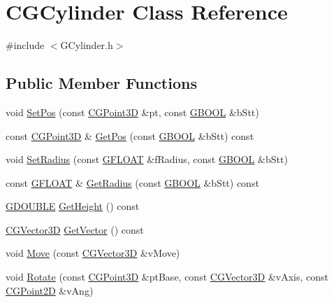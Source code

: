 \hypertarget{class_c_g_cylinder}{}\section{C\+G\+Cylinder Class Reference}
\label{class_c_g_cylinder}


{\ttfamily \#include $<$G\+Cylinder.\+h$>$}

\subsection*{Public Member Functions}
\begin{DoxyCompactItemize}
\item 
void \hyperlink{class_c_g_cylinder_ad4635b5bfc115548b15a307ff91fb421}{Set\+Pos} (const \hyperlink{class_c_g_point3_d}{C\+G\+Point3\+D} \&pt, const \hyperlink{_g_types_8h_a2901915743626352a6820c5405f556dc}{G\+B\+O\+O\+L} \&b\+Stt)
\item 
const \hyperlink{class_c_g_point3_d}{C\+G\+Point3\+D} \& \hyperlink{class_c_g_cylinder_a41b36f2988aa308d5e45092c78820f3d}{Get\+Pos} (const \hyperlink{_g_types_8h_a2901915743626352a6820c5405f556dc}{G\+B\+O\+O\+L} \&b\+Stt) const 
\item 
void \hyperlink{class_c_g_cylinder_ace12d1c70abbcecb19a3086659fba3da}{Set\+Radius} (const \hyperlink{_g_types_8h_abf6eba8223df62f199b811a6c52ff2ef}{G\+F\+L\+O\+A\+T} \&f\+Radius, const \hyperlink{_g_types_8h_a2901915743626352a6820c5405f556dc}{G\+B\+O\+O\+L} \&b\+Stt)
\item 
const \hyperlink{_g_types_8h_abf6eba8223df62f199b811a6c52ff2ef}{G\+F\+L\+O\+A\+T} \& \hyperlink{class_c_g_cylinder_a0b487033b9620f276364b59e6bbb9d18}{Get\+Radius} (const \hyperlink{_g_types_8h_a2901915743626352a6820c5405f556dc}{G\+B\+O\+O\+L} \&b\+Stt) const 
\item 
\hyperlink{_g_types_8h_afd05ac85f90ee8e2a733928545462cd4}{G\+D\+O\+U\+B\+L\+E} \hyperlink{class_c_g_cylinder_a21e316ea9b92290cdd1893b8459bebf6}{Get\+Height} () const 
\item 
\hyperlink{_g_point3_d_8h_aa7e73d39f4c991acb5a13c84b498366d}{C\+G\+Vector3\+D} \hyperlink{class_c_g_cylinder_a7af0685474819d9404bd9b4fe174b1d1}{Get\+Vector} () const 
\item 
void \hyperlink{class_c_g_cylinder_a25cdac59764f5496430e4ff4a0eeb0ca}{Move} (const \hyperlink{_g_point3_d_8h_aa7e73d39f4c991acb5a13c84b498366d}{C\+G\+Vector3\+D} \&v\+Move)
\item 
void \hyperlink{class_c_g_cylinder_a76c8b024cd8637d01cf8ee00264f8382}{Rotate} (const \hyperlink{class_c_g_point3_d}{C\+G\+Point3\+D} \&pt\+Base, const \hyperlink{_g_point3_d_8h_aa7e73d39f4c991acb5a13c84b498366d}{C\+G\+Vector3\+D} \&v\+Axis, const \hyperlink{class_c_g_point2_d}{C\+G\+Point2\+D} \&v\+Ang)

\end{DoxyCompactItemize}
